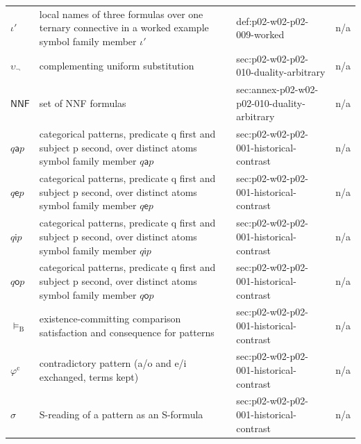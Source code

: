 \begin{longtable}{@{}p{}p{}p{}p{}@{}}
\(\iota'\) & local names of three formulas over one ternary connective in a worked example symbol family member \(\iota'\) & def:\allowbreak{}p02-\allowbreak{}w02-\allowbreak{}p02-\allowbreak{}009-\allowbreak{}worked & n/a \\
\(\upsilon_{\neg}\) & complementing uniform substitution & sec:\allowbreak{}p02-\allowbreak{}w02-\allowbreak{}p02-\allowbreak{}010-\allowbreak{}duality-\allowbreak{}arbitrary & n/a \\
\(\mathsf{NNF}\) & set of NNF formulas & sec:\allowbreak{}annex-\allowbreak{}p02-\allowbreak{}w02-\allowbreak{}p02-\allowbreak{}010-\allowbreak{}duality-\allowbreak{}arbitrary & n/a \\
\(q\mathbin{\mathsf a}p\) & categorical patterns, predicate q first and subject p second, over distinct atoms symbol family member \(q\mathbin{\mathsf a}p\) & sec:\allowbreak{}p02-\allowbreak{}w02-\allowbreak{}p02-\allowbreak{}001-\allowbreak{}historical-\allowbreak{}contrast & n/a \\
\(q\mathbin{\mathsf e}p\) & categorical patterns, predicate q first and subject p second, over distinct atoms symbol family member \(q\mathbin{\mathsf e}p\) & sec:\allowbreak{}p02-\allowbreak{}w02-\allowbreak{}p02-\allowbreak{}001-\allowbreak{}historical-\allowbreak{}contrast & n/a \\
\(q\mathbin{\mathsf i}p\) & categorical patterns, predicate q first and subject p second, over distinct atoms symbol family member \(q\mathbin{\mathsf i}p\) & sec:\allowbreak{}p02-\allowbreak{}w02-\allowbreak{}p02-\allowbreak{}001-\allowbreak{}historical-\allowbreak{}contrast & n/a \\
\(q\mathbin{\mathsf o}p\) & categorical patterns, predicate q first and subject p second, over distinct atoms symbol family member \(q\mathbin{\mathsf o}p\) & sec:\allowbreak{}p02-\allowbreak{}w02-\allowbreak{}p02-\allowbreak{}001-\allowbreak{}historical-\allowbreak{}contrast & n/a \\
\(\models_{\mathrm B}\) & existence-committing comparison satisfaction and consequence for patterns & sec:\allowbreak{}p02-\allowbreak{}w02-\allowbreak{}p02-\allowbreak{}001-\allowbreak{}historical-\allowbreak{}contrast & n/a \\
\(\varphi^{\mathrm c}\) & contradictory pattern (a/o and e/i exchanged, terms kept) & sec:\allowbreak{}p02-\allowbreak{}w02-\allowbreak{}p02-\allowbreak{}001-\allowbreak{}historical-\allowbreak{}contrast & n/a \\
\(\sigma\) & S-reading of a pattern as an S-formula & sec:\allowbreak{}p02-\allowbreak{}w02-\allowbreak{}p02-\allowbreak{}001-\allowbreak{}historical-\allowbreak{}contrast & n/a \\

\end{longtable}
